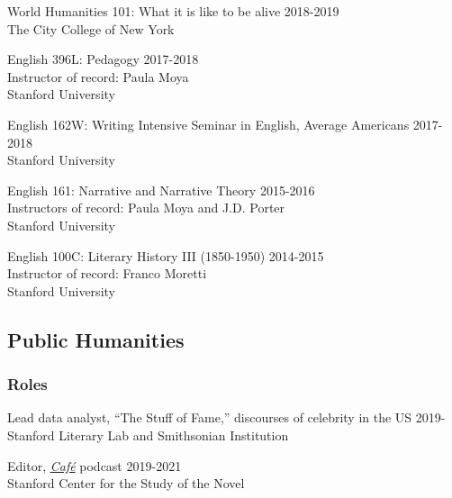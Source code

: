 \documentclass[
  12pt,
  letterpaper,
]{article}
\begin{document}
World Humanities 101: What it is like to be alive \hfill 2018-2019\\
\hspace*{0.333em} The City College of New York

English 396L: Pedagogy \hfill 2017-2018\\
\hspace*{0.333em} Instructor of record: Paula Moya\\
\hspace*{0.333em} Stanford University

English 162W: Writing Intensive Seminar in English, Average Americans
\hfill 2017-2018\\
\hspace*{0.333em} Stanford University

English 161: Narrative and Narrative Theory \hfill 2015-2016\\
\hspace*{0.333em} Instructors of record: Paula Moya and J.D. Porter\\
\hspace*{0.333em} Stanford University

English 100C: Literary History III (1850-1950) \hfill 2014-2015\\
\hspace*{0.333em} Instructor of record: Franco Moretti\\
\hspace*{0.333em} Stanford University

\hypertarget{public-humanities}{%
\subsection{Public Humanities}\label{public-humanities}}

\hypertarget{roles}{%
\subsubsection{Roles}\label{roles}}

Lead data analyst, ``The Stuff of Fame,'' discourses of celebrity in the
US \hfill 2019-\\
\hspace*{0.333em} Stanford Literary Lab and Smithsonian Institution

Editor, \href{https://novel.stanford.edu/csn-cafe}{\emph{Café}} podcast
\hfill 2019-2021\\
\hspace*{0.333em} Stanford Center for the Study of the Novel
\end{document}
